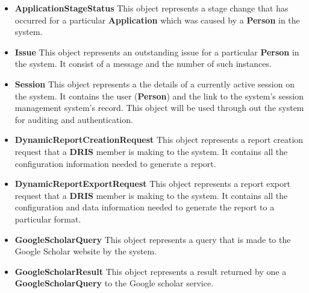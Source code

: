 \documentclass[12pt]{article}
\begin{document}
\newpage
\begin{itemize}
\item \textbf{ApplicationStageStatus}
This object represents a stage change that has occurred for a particular \textbf{Application} which was caused by a \textbf{Person} in the system.

\item \textbf{Issue}
This object represents an outstanding issue for a particular \textbf{Person} in the system. It consist of a message and the number of such instances.

\item \textbf{Session}
This object represents a the details of a currently active session on the system. It contains the user (\textbf{Person}) and the link to the system's session management system's record. This object will be used through out the system for auditing and authentication.

\item \textbf{DynamicReportCreationRequest}
This object represents a report creation request that a \textbf{DRIS} member is making to the system. It contains all the configuration information needed to generate a report.

\item \textbf{DynamicReportExportRequest}
This object represents a report export request that a \textbf{DRIS} member is making to the system. It contains all the configuration and data information needed to generate the report to a particular format.

\item \textbf{GoogleScholarQuery}
This object represents a query that is made to the Google Scholar website by the system.

\item \textbf{GoogleScholarResult}
This object represents a result returned by one a \textbf{GoogleScholarQuery} to the Google scholar service.

\end{itemize} 

\newpage
\end{document}
